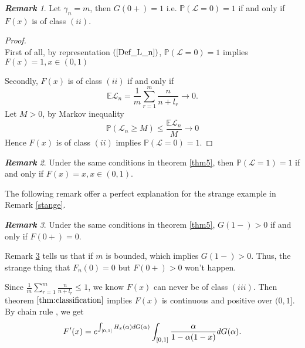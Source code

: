 \documentclass[12pt]{article}
\theoremstyle{plain}
\theoremstyle{definition}
\theoremstyle{remark}
\newtheorem{rem}{\textbf{Remark}}
\begin{document}
\begin{rem}
Let $\gamma_n=m$,  then $G(0+)=1$ i.e. $\mathbb{P}(\mathscr{L}=0)=1$ if and only if $F(x)$ is of class $(ii)$.
\end{rem}
\begin{proof}\ \\

    First of all, by representation $(\ref{Def_L_n})$, $\mathbb{P}(\mathscr{L}=0)=1$ implies $F(x)=1, x\in (0,1)$

    Secondly,
    $F(x)$ is of class $(ii)$ if and only if
    \begin{equation*}
        \mathbb{E}\mathscr{L}_n=\frac{1}{m} \sum_{r=1}^{m} \frac{n}{n+l_{r}} \rightarrow 0.
    \end{equation*}
    Let $M>0$, by Markov inequality
    \begin{equation*}
        \mathbb{P}(\mathscr{L}_n\geq M)\leq \frac{\mathbb{E}\mathscr{L}_n}{M} \rightarrow 0
    \end{equation*}
    Hence $F(x)$ is of class $(ii)$ implies $\mathbb{P}(\mathscr{L}=0)=1$.
\end{proof}


\begin{rem}
Under the same conditions in theorem \ref{thm5}, then $\mathbb{P}(\mathscr{L}=1)=1$ if and only if $F(x)=x,x\in (0,1)$.\\
\end{rem}
The following remark offer a perfect explanation for the strange example in Remark \ref{stange}.
\begin{rem}\label{useless1}
    Under the same conditions in theorem \ref{thm5}, $G(1-)>0$ if and only if $F(0+)=0$. \\
\end{rem}
Remark \ref{useless1} tells us that if $m$ is bounded, which implies $G(1-)>0$. Thus, the strange thing that $F_n(0)=0$ but $F(0+)>0$ won't happen.

Since $\frac{1}{m} \sum_{r=1}^{m} \frac{n}{n+l_{r}}\leq 1$, we know $F(x)$ can never be of class $(iii)$. Then theorem $\ref{thm:classification}$  implies $F(x)$ is continuous and positive over $(0,1]$.\\
By chain rule%
, we get
\begin{equation}
F'(x)=e^{\int_{[0,1]}H_{x}(\alpha)dG(\alpha)}\int_{[0,1]}\dfrac{\alpha}{1-\alpha(1-x)}dG(\alpha).\\
\end{equation}
\end{document}
